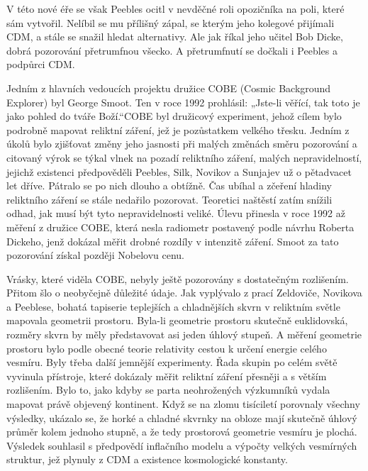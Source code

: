   V této nové éře se však Peebles ocitl v nevděčné roli opozičníka na poli, které sám vytvořil.
  Nelíbil se mu přílišný zápal, se kterým jeho kolegové přijímali CDM, a stále se snažil hledat
  alternativy. Ale jak říkal jeho učitel Bob Dicke, dobrá pozorování přetrumfnou všecko. A
  přetrumfnutí se dočkali i Peebles a podpůrci CDM. 
  
  Jedním z hlavních vedoucích projektu družice COBE (Cosmic Background Explorer) byl George Smoot.
  Ten v roce 1992 prohlásil: „Jste-li věřící, tak toto je jako pohled do tváře Boží.“COBE byl
  družicový experiment, jehož cílem bylo podrobně mapovat reliktní záření, jež je pozůstatkem
  velkého třesku. Jedním z úkolů bylo zjišťovat změny jeho jasnosti při malých změnách směru
  pozorování a citovaný výrok se týkal vlnek na pozadí reliktního záření, malých nepravidelností,
  jejichž existenci předpověděli Peebles, Silk, Novikov a Sunjajev už o pětadvacet let dříve.
  Pátralo se po nich dlouho a obtížně. Čas ubíhal a zčeření hladiny reliktního záření se stále
  nedařilo pozorovat. Teoretici naštěstí zatím snížili odhad, jak musí být tyto nepravidelnosti
  veliké. Úlevu přinesla v roce 1992 až měření z družice COBE, která nesla radiometr postavený podle
  návrhu Roberta Dickeho, jenž dokázal měřit drobné rozdíly v intenzitě záření. Smoot za tato
  pozorování získal později Nobelovu cenu. 
  
  Vrásky, které viděla COBE, nebyly ještě pozorovány s dostatečným rozlišením. Přitom šlo o
  neobyčejně důležité údaje. Jak vyplývalo z prací Zeldoviče, Novikova a Peeblese, bohatá tapiserie
  teplejších a chladnějších skvrn v reliktním světle mapovala geometrii prostoru. Byla-li geometrie
  prostoru skutečně euklidovská, rozměry skvrn by měly představovat asi jeden úhlový stupeň. A
  měření geometrie prostoru bylo podle obecné teorie relativity cestou k určení energie celého
  vesmíru. Byly třeba další jemnější experimenty. Řada skupin po celém světě vyvinula přístroje,
  které dokázaly měřit reliktní záření přesněji a s větším rozlišením. Bylo to, jako kdyby se parta
  neohrožených výzkumníků vydala mapovat právě objevený kontinent. Když se na zlomu tisíciletí
  porovnaly všechny výsledky, ukázalo se, že horké a chladné skvrnky na obloze mají skutečně úhlový
  průměr kolem jednoho stupně, a že tedy prostorová geometrie vesmíru je plochá. Výsledek souhlasil
  s předpovědí inflačního modelu a výpočty velkých vesmírných struktur, jež plynuly z CDM a
  existence kosmologické konstanty. 
  
